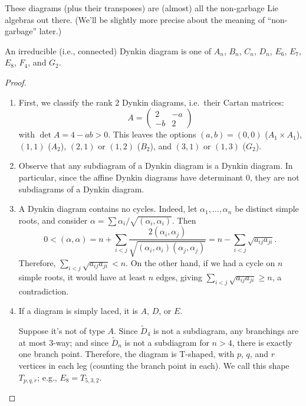 These diagrams (plus their transposes) are (almost) all the non-garbage Lie
algebras out there. (We'll be slightly more precise about the meaning of
``non-garbage'' later.)

\begin{theorem}
An irreducible (i.e., connected) Dynkin diagram is one of $A_n$, $B_n$, $C_n$,
$D_n$, $E_6$, $E_7$, $E_8$, $F_4$, and $G_2$.
\end{theorem}

\begin{proof}\leavevmode
\begin{enumerate}
  \item First, we classify the rank $2$ Dynkin diagrams, i.e.\ their Cartan
    matrices:
    \[
      A = \begin{pmatrix} 2 & -a \\ -b & 2 \end{pmatrix}
    \]
    with $\det A = 4 - ab > 0$. This leaves the options $(a, b) = (0, 0)$
    ($A_1 \times A_1$), $(1, 1)$ ($A_2$), $(2, 1)$ or $(1, 2)$ ($B_2$), and
    $(3, 1)$ or $(1, 3)$ ($G_2$).
  \item Observe that any subdiagram of a Dynkin diagram is a Dynkin diagram. In
    particular, since the affine Dynkin diagrams have determinant $0$, they
    are not subdiagrams of a Dynkin diagram.
  \item A Dynkin diagram contains no cycles. Indeed, let
    $\alpha_1, \dots, \alpha_n$ be distinct simple roots, and consider
    $\alpha = \sum \alpha_i/\sqrt{(\alpha_i, \alpha_i)}$. Then
    \[
      0 < (\alpha, \alpha) = n + \sum_{i<j}
        \frac{2(\alpha_i, \alpha_j)}{\sqrt{(\alpha_i, \alpha_i)(\alpha_j, \alpha_j)}}
        = n - \sum_{i<j} \sqrt{a_{ij}a_{ji}}.
    \]
    Therefore, $\sum_{i<j} \sqrt{a_{ij}a_{ji}} < n$. On the other hand, if we
    had a cycle on $n$ simple roots, it would have at least $n$ edges, giving
    $\sum_{i<j} \sqrt{a_{ij}a_{ji}} \geq n$, a contradiction.
  \item If a diagram is simply laced, it is $A$, $D$, or $E$.

    Suppose it's not of type $A$. Since $\tilde D_4$ is not a subdiagram, any
    branchings are at most $3$-way; and since $\tilde D_n$ is not a subdiagram
    for $n > 4$, there is exactly one branch point. Therefore, the diagram is
    T-shaped, with $p$, $q$, and $r$ vertices in each leg (counting the branch
    point in each). We call this shape $T_{p,q,r}$; e.g., $E_8 = T_{5,3,2}$.


\end{enumerate}
\end{proof}

